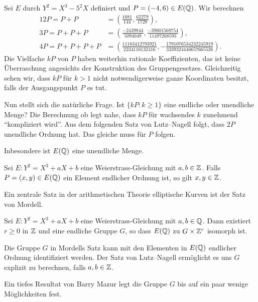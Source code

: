 \begin{beispiel}
  Sei $E$ durch $Y^2 = X^3-5^2X$ definiert und $P = (-4,6) \in
  E({\mathbb{Q}})$.
  Wir berechnen
  \begin{alignat*}1
    2P=P+P &= \left(\frac{1681}{144}, \frac{62279}{1728}\right),\\
    3P=P+P +P &= \left(\frac{-2439844}{5094049}, \frac{-39601568754}{11497268593} \right),\\
    4P= P+P +P+P &= \left( \frac{11183412793921}{2234116132416}, -\frac{1791076534232245919}{3339324446657665536}\right).
  \end{alignat*}
  Die Vielfache $kP$ von $P$ haben weiterhin rationale Koeffizienten,
  das ist keine Überraschung angesichts der Konstruktion des
  Gruppengesetzes. Gleichzeitig sehen wir, dass $kP$ für $k>1$ nicht
  notwendigerweise ganze Koordinaten besitzt, falls der Ausgangspunkt $P$
  es tut.

  Nun stellt sich die natürliche Frage. Ist $\{ kP : k\ge 1\}$ eine
  endliche oder unendliche Menge? Die Berechnung ob legt nahe, dass
  $kP$ für wachsendes $k$ zunehmend ``kompliziert wird''.
  Aus dem folgenden Satz von Lutz--Nagell folgt, dass $2P$ unendliche
  Ordnung hat. Das gleiche muss für $P$ folgen.

  Inbesondere ist $E({\mathbb{Q}})$ eine unendliche Menge. 
\end{beispiel}

\begin{satz}
  Sei $E:Y^2=X^3+aX+b$ eine Weierstrass-Gleichung mit $a,b\in{\mathbb{Z}}$.
  Falls $ P =(x,y)\in E({\mathbb{Q}})$ ein Element endlicher Ordnung ist, so
  gilt $x,y\in{\mathbb{Z}}$. 
\end{satz}

Ein zentrale Satz in der arithmetischen Theorie elliptische Kurven ist
der Satz von Mordell.

\begin{satz}[Mordell (1922)] Sei $E:Y^2 = X^3+aX+b$ eine
  Weierstrass-Gleichung mit $a,b\in{\mathbb{Q}}$. Dann existiert $r\ge 0$ in
  ${\mathbb{Z}}$ und eine endliche Gruppe $G$, so dass
  $E({\mathbb{Q}})$ zu $G\times {\mathbb{Z}}^r$ isomorph ist.
\end{satz}

Die Gruppe $G$ in Mordells Satz kann mit den Elementen in $E({\mathbb{Q}})$
endlicher Ordnung identifiziert werden. Der Satz von Lutz--Nagell
ermöglicht es uns $G$ explizit zu berechnen, falls $a,b\in{\mathbb{Z}}$.

Ein tiefes Resultat von Barry Mazur legt die Gruppe $G$ bis auf ein
paar wenige Möglichkeiten fest.

